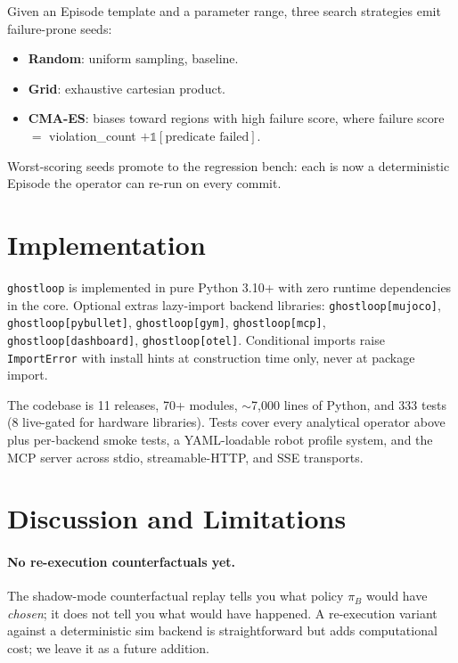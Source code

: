 \documentclass[11pt]{article}
\begin{document}
Given an Episode template and a parameter range, three search
strategies emit failure-prone seeds:

\begin{itemize}
  \item \textbf{Random}: uniform sampling, baseline.
  \item \textbf{Grid}: exhaustive cartesian product.
  \item \textbf{CMA-ES}: \citep{hansen2003cmaes} biases toward
        regions with high failure score, where failure score $=$
        violation\_count $+ \mathbb{1}[\text{predicate failed}]$.
\end{itemize}

Worst-scoring seeds promote to the regression bench: each is now
a deterministic Episode the operator can re-run on every commit.

\section{Implementation}

\texttt{ghostloop} is implemented in pure Python 3.10+ with zero
runtime dependencies in the core. Optional extras lazy-import
backend libraries: \texttt{ghostloop[mujoco]},
\texttt{ghostloop[pybullet]}, \texttt{ghostloop[gym]},
\texttt{ghostloop[mcp]}, \texttt{ghostloop[dashboard]},
\texttt{ghostloop[otel]}. Conditional imports raise
\texttt{ImportError} with install hints at construction time only,
never at package import.

The codebase is 11 releases, 70+ modules, $\sim$7,000 lines of
Python, and 333 tests (8 live-gated for hardware libraries). Tests
cover every analytical operator above plus per-backend smoke
tests, a YAML-loadable robot profile system, and the MCP server
across stdio, streamable-HTTP, and SSE transports.

\section{Discussion and Limitations}

\paragraph{No re-execution counterfactuals yet.} The shadow-mode
counterfactual replay tells you what policy $\pi_B$ would have
\emph{chosen}; it does not tell you what would have happened. A
re-execution variant against a deterministic sim backend is
straightforward but adds computational cost; we leave it as a
future addition.
\end{document}

